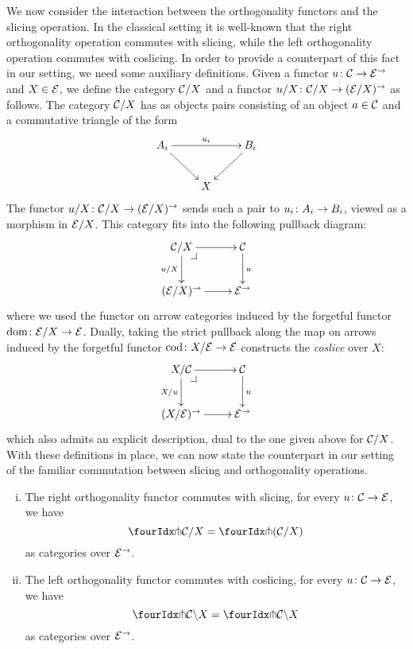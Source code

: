 \documentclass[reqno,10pt,a4paper,oneside]{amsart}
\begin{document}
We now consider the interaction between the orthogonality functors and the slicing operation. In the classical setting it is well-known that the right orthogonality operation commutes with slicing, while the left orthogonality operation commutes with coslicing.  In order to provide a counterpart of this fact in our setting, we need some auxiliary definitions. Given a functor $u \co \cal{C} \to \catE^{\to}$ and $X \in \catE$, we define the category $\cal{C}/X$
and a functor $u/X \co \cal{C}/X \to (\cal{E}/X)^\to$ as follows. The category $\cal{C}/X$ has as objects pairs consisting of an object $a \in \cal{C}$ and a commutative triangle of the form
\[
\xymatrix{
A_i \ar[dr] \ar[rr]^{u_i} & & B_i \ar[dl] \\
 & X }
 \]
The functor $u/X \co \cal{C}/X \to (\cal{E}/X)^\to$ sends such a pair to $u_i \co A_i \to B_i$, viewed as a morphism in $\cal{E}/X$. This category fits into the
following pullback diagram:
\[
\xymatrix{
  \cal{C}/X
  \ar[r]
  \ar[d]_{u/X}
  \pullback{dr}
&
  \cal{C}
  \ar[d]^{u}
\\
  (\catE/X)^{\to}
  \ar[r]
&
  \catE^{\to}
}
\]
where we used the functor on arrow categories induced by the forgetful functor $\operatorname{dom} \co \catE/X \to \catE$.  Dually, taking the strict pullback along the map on arrows induced by the forgetful functor 
$\operatorname{cod} \co X/\cal{E} \to \catE$ constructs the \emph{coslice} over $X$:
\[
\xymatrix{
  X/\cal{C}
  \ar[r]
  \ar[d]_{X/u}
  \pullback{dr}
&
  \cal{C}
  \ar[d]^{u}
\\
  (X/\catE)^{\to}
  \ar[r]
&
  \catE^{\to}
}
\]
which also admits an explicit description, dual to the one given above for $\cal{C}/X$. With these definitions in place, we can now state the counterpart in our setting of the familiar commutation between slicing and orthogonality operations. 



\begin{proposition} \hfill 
\label{pitchfork-slicing}
\begin{enumerate}[(i)]
\item The right orthogonality functor commutes with slicing, \ie for every $u \co \cal{C} \to \cal{E}$, we have
\[
  \liftr{\cal{C}}/X = \liftr{(\cal{C}/X)}
\]
as categories over $\cal{E}^\to$.
\item The left orthogonality functor commutes with coslicing, \ie for every $u \co \cal{C} \to \cal{E}$, we have
\[
 \liftl{\cal{C}} \backslash X = \liftl{\cal{C} \backslash X}
\]
as categories over $\cal{E}^\to$.
\end{enumerate}
\end{proposition}
\end{document}
